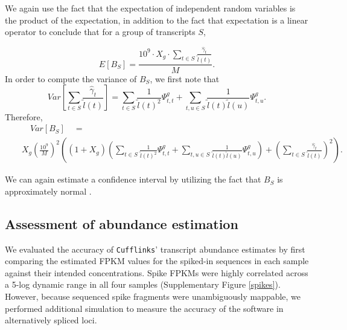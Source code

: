 \documentclass[12pt]{amsart}
\theoremstyle{definition}
\begin{document}
We again use the fact that the expectation of independent random variables is
the product of the expectation, in addition to the fact that expectation is a
linear operator to conclude that for a group of transcripts $S$,

\begin{equation}
\label{eq:expectTSS}
E[B_S] = \frac{10^9 \cdot X_g \cdot \sum_{t \in S} \frac{\hat{\gamma}_t}{\tilde{l}(t)}}{M}.
\end{equation}
In order to compute the variance of $B_S$, we first note that 
\begin{equation}
Var\left[\sum_{t \in S} \frac{\hat{\gamma}_t}{\tilde{l}(t)}\right] = \sum_{t \in S}\frac{1}{\tilde{l}(t)^2}\Psi^g_{t,t} + \sum_{t,u \in S} \frac{1}{\tilde{l}(t)\tilde{l}(u)} \Psi^g_{t,u}.
\end{equation}
Therefore,
\begin{eqnarray}
& & \quad Var[B_S] \quad = \quad \nonumber \\ 
& &  X_g\left(\frac{10^9}{M}\right)^2\left( \left(1+X_g\right) \left(\sum_{t \in S}\frac{1}{\tilde{l}(t)^2}\Psi^g_{t,t} + \sum_{t,u \in S} \frac{1}{\tilde{l}(t)\tilde{l}(u)} \Psi^g_{t,u}\right) + \left( \sum_{t \in S} \frac{\hat{\gamma}_t}{\tilde{l}(t)} \right)^2 \right). \label{eq:varTSS}
\end{eqnarray}

We can again estimate a confidence interval by utilizing the fact that $B_S$
is approximately normal \cite{Aroian1978}.

\subsection{Assessment of abundance estimation}

We evaluated the accuracy of {\tt Cufflinks}' transcript abundance estimates by first comparing the estimated FPKM values for the spiked-in sequences in each sample against their intended concentrations.  Spike FPKMs were highly correlated across a 5-log dynamic range in all four samples (Supplementary Figure \ref{spikes}).  However, because sequenced spike fragments were unambiguously mappable, we performed additional simulation to measure the accuracy of the software in alternatively spliced loci. 
\end{document}
